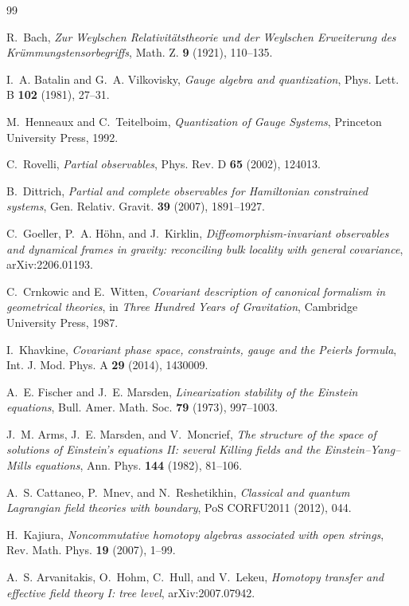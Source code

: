 \documentclass[11pt]{article}
\theoremstyle{definition}
\theoremstyle{remark}
\begin{document}
\begin{thebibliography}{99}
\sloppy
\raggedright

R.~Bach,
\emph{Zur Weylschen Relativit\"atstheorie und der Weylschen Erweiterung des
Kr\"ummungstensorbegriffs},
Math. Z. \textbf{9} (1921), 110--135.

I.~A. Batalin and G.~A. Vilkovisky,
\emph{Gauge algebra and quantization},
Phys. Lett. B \textbf{102} (1981), 27--31.

M.~Henneaux and C.~Teitelboim,
\emph{Quantization of Gauge Systems},
Princeton University Press, 1992.

C.~Rovelli,
\emph{Partial observables},
Phys. Rev. D \textbf{65} (2002), 124013.

B.~Dittrich,
\emph{Partial and complete observables for Hamiltonian constrained systems},
Gen. Relativ. Gravit. \textbf{39} (2007), 1891--1927.

C.~Goeller, P.~A. H\"ohn, and J.~Kirklin,
\emph{Diffeomorphism-invariant observables and dynamical frames in gravity:
reconciling bulk locality with general covariance},
arXiv:2206.01193.

C.~Crnkowic and E.~Witten,
\emph{Covariant description of canonical formalism in geometrical theories},
in \emph{Three Hundred Years of Gravitation}, Cambridge University Press,
1987.

I.~Khavkine,
\emph{Covariant phase space, constraints, gauge and the Peierls formula},
Int. J. Mod. Phys. A \textbf{29} (2014), 1430009.

A.~E. Fischer and J.~E. Marsden,
\emph{Linearization stability of the Einstein equations},
Bull. Amer. Math. Soc. \textbf{79} (1973), 997--1003.

J.~M. Arms, J.~E. Marsden, and V.~Moncrief,
\emph{The structure of the space of solutions of Einstein's equations II:
several Killing fields and the Einstein--Yang--Mills equations},
Ann. Phys. \textbf{144} (1982), 81--106.

A.~S. Cattaneo, P.~Mnev, and N.~Reshetikhin,
\emph{Classical and quantum Lagrangian field theories with boundary},
PoS CORFU2011 (2012), 044.

H.~Kajiura,
\emph{Noncommutative homotopy algebras associated with open strings},
Rev. Math. Phys. \textbf{19} (2007), 1--99.

A.~S. Arvanitakis, O.~Hohm, C.~Hull, and V.~Lekeu,
\emph{Homotopy transfer and effective field theory I: tree level},
arXiv:2007.07942.


\end{thebibliography}
\end{document}
